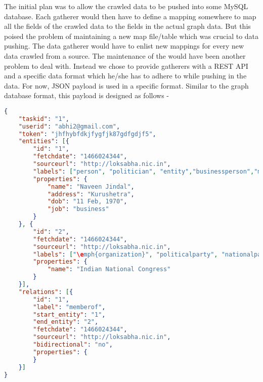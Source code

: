 The initial plan was to allow the crawled data to be pushed into some MySQL database. Each gatherer would then have to define a mapping somewhere to map all the fields of the crawled data to the fields in the actual graph data. But this poised the problem of maintaining a new map file/table which was crucial to data pushing. The data gatherer would have to enlist new mappings for every new data crawled from a source. The maintenance of the  would have been another problem to deal with.
%
Instead we chose to provide gatherers with a REST API and  a specific data format which he/she has to adhere to while pushing in the data.
For now, JSON payload is used in a specific format. Similar to the graph database format, this payload is designed as follows -

\begin{lstlisting}[language=json,firstnumber=1]
{
    "taskid": "1",
    "userid": "abhi2@gmail.com",
    "token": "jhfhybfdkjfygfjk87gdfgdjf5",
    "entities": [{
        "id": "1",
        "fetchdate": "1466024344",
        "sourceurl": "http://loksabha.nic.in",
        "labels": ["person", "politician", "entity","businessperson","memberofParliament"],
        "properties": {
            "name": "Naveen Jindal",
            "address": "Kurushetra",
            "dob": "11 Feb, 1970",
            "job": "business"
        }
    }, {
        "id": "2",
        "fetchdate": "1466024344",
        "sourceurl": "http://loksabha.nic.in",
        "labels": ["\emph{organization}", "politicalparty", "nationalparty", "entity"],
        "properties": {
            "name": "Indian National Congress"
        }
    }],
    "relations": [{
        "id": "1",
        "label": "memberof",
        "start_entity": "1",
        "end_entity": "2",
        "fetchdate": "1466024344",
        "sourceurl": "http://loksabha.nic.in",
        "bidirectional": "no",
        "properties": {
        }
    }]
}
\end{lstlisting}

